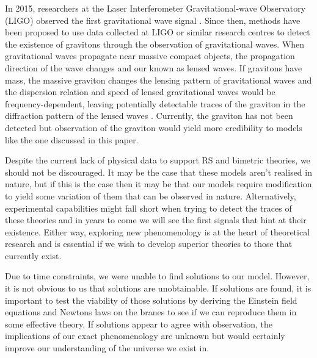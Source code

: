 \documentclass[11pt]{report}
\numberwithin{equation}{chapter}
\begin{document}
In 2015, researchers at the Laser Interferometer Gravitational-wave Observatory (LIGO) observed the first gravitational wave signal \cite{PhysRevLett.116.061102}. Since then, methods have been proposed to use data collected at LIGO or similar research centres to detect the existence of gravitons through the observation of gravitational waves. When gravitational waves propagate near massive compact objects, the propagation direction of the wave changes and our known as lensed waves. If gravitons have mass, the massive graviton changes the lensing pattern of gravitational waves and the dispersion relation and speed of lensed gravitational waves would be frequency-dependent, leaving potentially detectable traces of the graviton in the diffraction pattern of the lensed waves \cite{unknown}. Currently, the graviton has not been detected but observation of the graviton would yield more credibility to models like the one discussed in this paper.

Despite the current lack of physical data to support RS and bimetric theories, we should not be discouraged. It may be the case that these models aren’t realised in nature, but if this is the case then it may be that our models require modification to yield some variation of them that can be observed in nature. Alternatively, experimental capabilities might fall short when trying to detect the traces of these theories and in years to come we will see the first signals that hint at their existence. Either way, exploring new phenomenology is at the heart of theoretical research and is essential if we wish to develop superior theories to those that currently exist.

Due to time constraints, we were unable to find solutions to our model. However, it is not obvious to us that solutions are unobtainable. If solutions are found, it is important to test the viability of those solutions by deriving the Einstein field equations and Newtons laws on the branes to see if we can reproduce them in some effective theory. If solutions appear to agree with observation, the implications of our exact phenomenology are unknown but would certainly improve our understanding of the universe we exist in. 
\appendix
\end{document}
